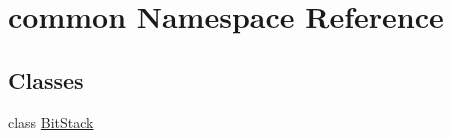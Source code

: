 \hypertarget{namespacecommon}{}\section{common Namespace Reference}
\label{namespacecommon}
\subsection*{Classes}
\begin{DoxyCompactItemize}
\item 
class \hyperlink{classcommon_1_1BitStack}{Bit\+Stack}
\end{DoxyCompactItemize}
